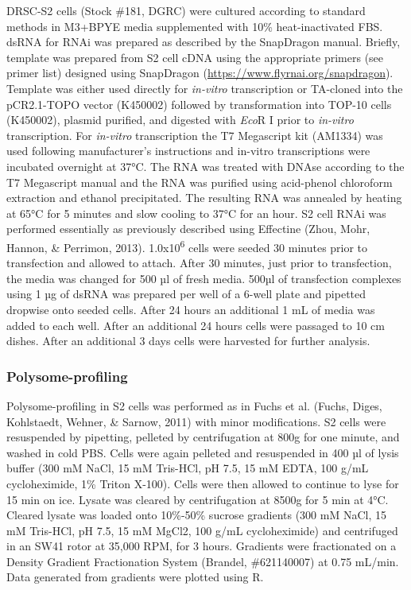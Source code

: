 \documentclass[12pt,oneside]{reedthesis}
\begin{document}
DRSC-S2 cells (Stock \#181, DGRC) were cultured according to standard methods in M3+BPYE media supplemented with 10\% heat-inactivated FBS. dsRNA for RNAi was prepared as described by the SnapDragon manual. Briefly, template was prepared from S2 cell cDNA using the appropriate primers (see primer list) designed using SnapDragon (\url{https://www.flyrnai.org/snapdragon}). Template was either used directly for \emph{in-vitro} transcription or TA-cloned into the pCR2.1-TOPO vector (K450002) followed by transformation into TOP-10 cells (K450002), plasmid purified, and digested with \emph{Eco}R I prior to \emph{in-vitro} transcription. For \emph{in-vitro} transcription the T7 Megascript kit (AM1334) was used following manufacturer's instructions and in-vitro transcriptions were incubated overnight at 37°C. The RNA was treated with DNAse according to the T7 Megascript manual and the RNA was purified using acid-phenol chloroform extraction and ethanol precipitated. The resulting RNA was annealed by heating at 65°C for 5 minutes and slow cooling to 37°C for an hour. S2 cell RNAi was performed essentially as previously described using Effectine (Zhou, Mohr, Hannon, \& Perrimon, 2013). 1.0x10\textsuperscript{6} cells were seeded 30 minutes prior to transfection and allowed to attach. After 30 minutes, just prior to transfection, the media was changed for 500 µl of fresh media. 500µl of transfection complexes using 1 µg of dsRNA was prepared per well of a 6-well plate and pipetted dropwise onto seeded cells. After 24 hours an additional 1 mL of media was added to each well. After an additional 24 hours cells were passaged to 10 cm dishes. After an additional 3 days cells were harvested for further analysis.

\hypertarget{polysome-profiling}{%
\subsubsection{Polysome-profiling}\label{polysome-profiling}}

Polysome-profiling in S2 cells was performed as in Fuchs et al. (Fuchs, Diges, Kohlstaedt, Wehner, \& Sarnow, 2011) with minor modifications. S2 cells were resuspended by pipetting, pelleted by centrifugation at 800g for one minute, and washed in cold PBS. Cells were again pelleted and resuspended in 400 µl of lysis buffer (300 mM NaCl, 15 mM Tris-HCl, pH 7.5, 15 mM EDTA, 100 g/mL cycloheximide, 1\% Triton X-100). Cells were then allowed to continue to lyse for 15 min on ice. Lysate was cleared by centrifugation at 8500g for 5 min at 4°C. Cleared lysate was loaded onto 10\%-50\% sucrose gradients (300 mM NaCl, 15 mM Tris-HCl, pH 7.5, 15 mM MgCl2, 100 g/mL cycloheximide) and centrifuged in an SW41 rotor at 35,000 RPM, for 3 hours. Gradients were fractionated on a Density Gradient Fractionation System (Brandel, \#621140007) at 0.75 mL/min. Data generated from gradients were plotted using R.
\end{document}
